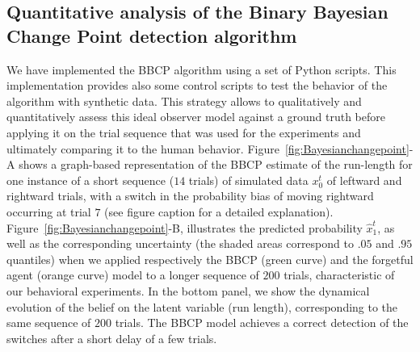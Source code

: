 \documentclass[10pt,letterpaper]{article}
\newcommand{\seeFig}[1]{Figure~\ref{fig:#1}}
\newcommand{\seeApp}[1]{Appendix~\ref{app:#1}}
\newcommand{\CP}[1]{\textbf{\textcolor{green}{[CP: #1]}}}
\begin{document}
\subsection{Quantitative analysis of the Binary Bayesian Change Point detection algorithm}
We have implemented
the BBCP algorithm %
using a set of Python scripts.
This implementation provides also some control scripts
to test the behavior of the algorithm with synthetic data.
This strategy allows to qualitatively and quantitatively assess
this ideal observer model against a ground truth before applying it
on the trial sequence that was used for the experiments and
ultimately comparing it to the human behavior. %
\seeFig{Bayesianchangepoint}-A shows a graph-based representation of the BBCP estimate of the run-length for one instance of a short sequence ($14$ trials) of simulated data $x_0^t$
of leftward and rightward trials, with a switch in the probability bias
of moving rightward occurring at trial $7$ (see figure caption for a detailed explanation).
\seeFig{Bayesianchangepoint}-B, illustrates the predicted probability $\hat{x}_1^t$, as well as the corresponding uncertainty (the shaded areas correspond to $.05$ and $.95$ quantiles) when
we applied respectively the BBCP (green curve) and the forgetful agent (orange curve) model to
a longer sequence of $200$ trials,
characteristic of our behavioral experiments.
In the bottom panel,
we show the dynamical evolution of the belief on the latent variable (run length),
corresponding to the same sequence of $200$ trials.
The BBCP model achieves a correct detection of the switches after a short delay of a few trials.
\end{document}
